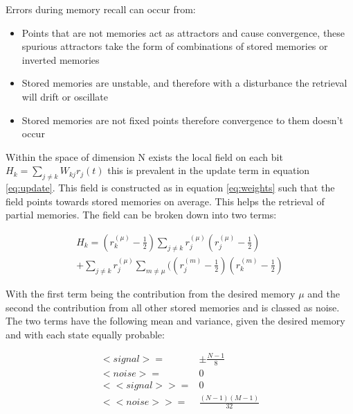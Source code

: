 \documentclass[twoside,twocolumn]{article}
\begin{document}
Errors during memory recall can occur from: 
\begin{itemize}
\item Points that are not memories act as attractors and cause convergence, these spurious attractors take the form of combinations of stored memories or inverted memories
\item Stored memories are unstable, and therefore with a disturbance the retrieval will drift or oscillate
\item Stored memories are not fixed points therefore convergence to them doesn't occur
\end{itemize}
Within the space of dimension N exists the local field on each bit $H_k = \sum_{j\neq k} W_{kj}r_j(t)$ this is prevalent in the update term in equation \ref{eq:update}. This field is constructed as in equation \ref{eq:weights} such that the field points towards stored memories on average. This helps the retrieval of partial memories. The field can be broken down into two terms:

\begin{gather}
H_k = (r_k^{(\mu)}-\frac{1}{2})\sum\limits_{j \neq k} r_j^{(\mu)}(r_j^{(\mu)}-\frac{1}{2}) \nonumber \\
+\sum\limits_{j \neq k} r_j^{(\mu)} \sum\limits_{m \neq \mu}(  (r_j^{(m)}-\frac{1}{2})(r_k^{(m)}-\frac{1}{2})  \nonumber
\end{gather}

With the first term being the contribution from the desired memory $\mu$ and the second the contribution from all other stored memories and is classed as noise. The two terms have the following mean and variance, given the desired memory and with each state equally probable:

\begin{align}
<signal> =& \pm \frac{N-1}{8} \nonumber \\
<noise> =& 0 \nonumber \\
<<signal>> =& 0 \nonumber\\
<<noise>> =& \frac{(N-1)(M-1)}{32} \nonumber 
\end{align}
\end{document}
